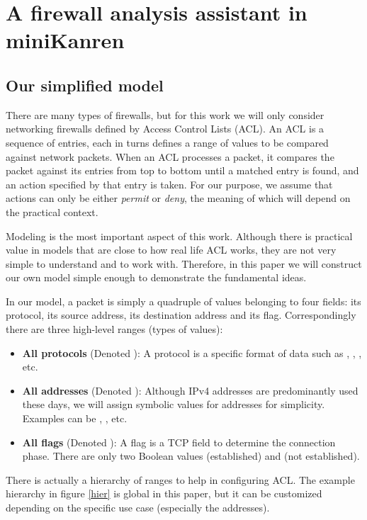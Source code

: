 \section{A firewall analysis assistant in miniKanren}\label{firewall}
\subsection{Our simplified model}
There are many types of firewalls, but for this work we will only consider networking firewalls defined by Access Control Lists (ACL). An ACL is a sequence of entries, each in turns defines a range of values to be compared against network packets. When an ACL processes a packet, it compares the packet against its entries from top to bottom until a matched entry is found, and an action specified by that entry is taken. For our purpose, we assume that actions can only be either \textit{permit} or \textit{deny}, the meaning of which will depend on the practical context.

Modeling is the most important aspect of this work. Although there is practical value in models that are close to how real life ACL works, they are not very simple to understand and to work with. Therefore, in this paper we will construct our own model simple enough to demonstrate the fundamental ideas.

In our model, a packet is simply a quadruple of values belonging to four fields: its protocol, its source address, its destination address and its flag. Correspondingly there are three high-level ranges (types of values):
\begin{itemize}
    \item \textbf{All protocols} (Denoted ): A protocol is a specific format of data such as , , , etc.
    \item \textbf{All addresses} (Denoted ): Although IPv4 addresses are predominantly used these days, we will assign symbolic values for addresses for simplicity. Examples can be , , etc.
    \item \textbf{All flags} (Denoted ): A flag is a TCP field to determine the connection phase. There are only two Boolean values  (established) and  (not established).
\end{itemize}

There is actually a hierarchy of ranges to help in configuring ACL. The example hierarchy in figure \ref{hier} is global in this paper, but it can be customized depending on the specific use case (especially the addresses).

